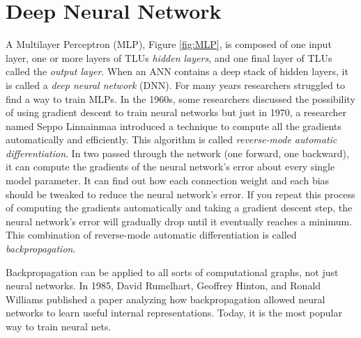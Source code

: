 \section{Deep Neural Network}
A Multilayer Perceptron (MLP), Figure \ref{fig:MLP}, is composed of one input layer, one or more layers of TLUs \textit{hidden layers}, and one final layer of TLUs called the \textit{output layer}.
When an ANN contains a deep stack of hidden layers, it is called a \textit{deep neural network} (DNN). 
For many years researchers struggled to find a way to train MLPs. In the 1960s, some researchers discussed the possibility of using gradient descent to train neural networks but just in 1970, a researcher named Seppo Linnainmaa introduced a technique to compute all the gradients automatically and efficiently. This algorithm is called \textit{reverse-mode automatic differentiation}. 
In two passed through the network (one forward, one backward), it can compute the gradients of the neural network's error about every single model parameter.
It can find out how each connection weight and each bias should be tweaked to reduce the neural network's error. 
If you repeat this process of computing the gradients automatically and taking a gradient descent step, the neural network's error will gradually drop until it eventually reaches a minimum. This combination of reverse-mode automatic differentiation is called \textit{backpropagation}.

Backpropagation can be applied to all sorts of computational graphs, not just neural networks. In 1985, David Rumelhart, Geoffrey Hinton, and Ronald Williams published a paper \parencite{rumelhart1986learning} analyzing how backpropagation allowed neural networks to learn useful internal representations. Today, it is the most popular way to train neural nets.













